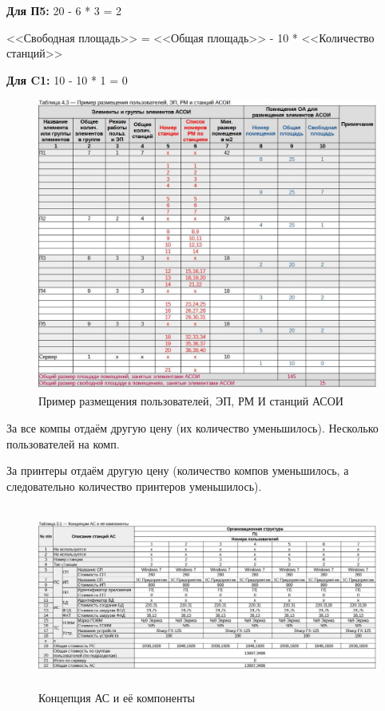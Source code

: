 \documentclass[12pt, a4paper, simple]{eskdtext}
\begin{document}
    \textbf{Для П5:} 20 - 6 * 3 = 2

    <<Свободная площадь>> = <<Общая площадь>> - 10 * <<Количество станций>>

    \textbf{Для C1:} 10 - 10 * 1 = 0

    \begin{figure}[ht!]
        \centering
        \includegraphics[width=14cm]
            {_docs/Таблица4-3ПримерРазмещенияПользователейЭПРМИСтанцийАСОИ.jpg}
        \caption{Пример размещения пользователей, ЭП, РМ И станций АСОИ}
    \end{figure}

    \newpage

    За все компы отдаём другую цену (их количество уменьшилось). Несколько пользователей на комп.

    За принтеры отдаём другую цену (количество компов уменьшилось, а следовательно количество принтеров уменьшилось).

    \begin{figure}[!hp]
        \centering
        \includegraphics[height=6cm]
            {_docs/Таблица3-1КонцепцияАСИЕеКомпоненты__лаб2_П1.jpg}
        \caption{Концепция АС и её компоненты}
    \end{figure}
\end{document}
